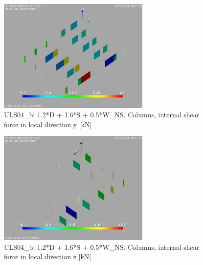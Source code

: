 \begin{figure}
\begin{center}
\includegraphics[width=75mm]{annex_res_columns/graphics/resSimplLC/ULS04_bcolumnsQy}
\caption{ULS04\_b: 1.2*D + 1.6*S + 0.5*W\_NS. Columns, internal shear force in local direction y [kN]}
\end{center}
\end{figure}
\begin{figure}
\begin{center}
\includegraphics[width=75mm]{annex_res_columns/graphics/resSimplLC/ULS04_bcolumnsQz}
\caption{ULS04\_b: 1.2*D + 1.6*S + 0.5*W\_NS. Columns, internal shear force in local direction z [kN]}
\end{center}
\end{figure}

